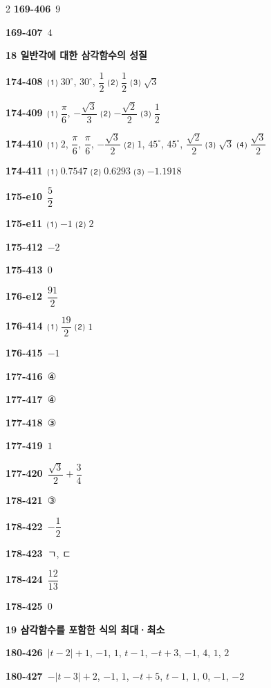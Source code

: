 \documentclass[10pt,a4paper]{article}
\begin{document}
\begin{multicols}{2}
\noindent\textbf{169-406}\ $9$\par
\noindent\textbf{169-407}\ $4$\par
\noindent\textbf{18 일반각에 대한 삼각함수의 성질}\par\smallskip
\noindent\textbf{174-408}\ ⑴ $30^\circ$, $30^\circ$, $\dfrac{1}{2}$ ⑵ $\dfrac{1}{2}$ ⑶ $\sqrt{3}$\par
\noindent\textbf{174-409}\ ⑴ $\dfrac{\pi}{6}$, $-\dfrac{\sqrt{3}}{3}$ ⑵ $-\dfrac{\sqrt{2}}{2}$ ⑶ $\dfrac{1}{2}$\par
\noindent\textbf{174-410}\ ⑴ $2$, $\dfrac{\pi}{6}$, $\dfrac{\pi}{6}$, $-\dfrac{\sqrt{3}}{2}$ ⑵ $1$, $45^\circ$, $45^\circ$, $\dfrac{\sqrt{2}}{2}$ ⑶ $\sqrt{3}$ ⑷ $\dfrac{\sqrt{3}}{2}$\par
\noindent\textbf{174-411}\ ⑴ $0.7547$ ⑵ $0.6293$ ⑶ $-1.1918$\par
\noindent\textbf{175-e10}\ $\dfrac{5}{2}$\par
\noindent\textbf{175-e11}\ ⑴ $-1$ ⑵ $2$\par
\noindent\textbf{175-412}\ $-2$\par
\noindent\textbf{175-413}\ $0$\par
\noindent\textbf{176-e12}\ $\dfrac{91}{2}$\par
\noindent\textbf{176-414}\ ⑴ $\dfrac{19}{2}$ ⑵ $1$\par
\noindent\textbf{176-415}\ $-1$\par
\noindent\textbf{177-416}\ ④\par
\noindent\textbf{177-417}\ ④\par
\noindent\textbf{177-418}\ ③\par
\noindent\textbf{177-419}\ $1$\par
\noindent\textbf{177-420}\ $\dfrac{\sqrt{3}}{2}+\dfrac{3}{4}$\par
\noindent\textbf{178-421}\ ③\par
\noindent\textbf{178-422}\ $-\dfrac{1}{2}$\par
\noindent\textbf{178-423}\ ㄱ, ㄷ\par
\noindent\textbf{178-424}\ $\dfrac{12}{13}$\par
\noindent\textbf{178-425}\ $0$\par
\noindent\textbf{19 삼각함수를 포함한 식의 최대·최소}\par\smallskip
\noindent\textbf{180-426}\ $|t-2|+1$, $-1$, $1$, $t-1$, $-t+3$, $-1$, $4$, $1$, $2$\par
\noindent\textbf{180-427}\ $-|t-3|+2$, $-1$, $1$, $-t+5$, $t-1$, $1$, $0$, $-1$, $-2$\par

\end{multicols}
\end{document}
